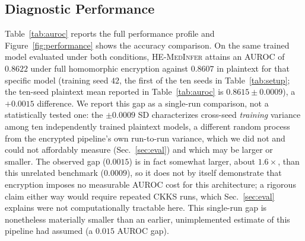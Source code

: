\documentclass[journal,compsoc]{IEEEtran}
\newcommand{\framework}{\textsc{HE-MedInfer}}
\begin{document}
\subsection{Diagnostic Performance}

Table~\ref{tab:auroc} reports the full performance profile and
Figure~\ref{fig:performance} shows the accuracy comparison. On the same
trained model evaluated under both conditions, \framework{} attains an AUROC
of $0.8622$ under full homomorphic encryption against $0.8607$ in plaintext
for that specific model (training seed $42$, the first of the ten seeds in
Table~\ref{tab:setup}; the ten-seed plaintext mean reported in
Table~\ref{tab:auroc} is $0.8615 \pm 0.0009$), a $+0.0015$ difference. We
report this gap as a single-run comparison, not a statistically tested one:
the $\pm 0.0009$ SD characterizes cross-seed \emph{training} variance among
ten independently trained plaintext models, a different random process from
the encrypted pipeline's own run-to-run variance, which we did not and could
not affordably measure (Sec.~\ref{sec:eval}) and which may be larger or
smaller. The observed gap ($0.0015$) is in fact somewhat larger, about
$1.6\times$, than this unrelated benchmark ($0.0009$), so it does not by
itself demonstrate that encryption imposes no measurable AUROC cost for
this architecture; a rigorous claim either way would require repeated CKKS
runs, which Sec.~\ref{sec:eval} explains were not
computationally tractable here. This single-run gap is nonetheless
materially smaller than an earlier, unimplemented estimate of this pipeline
had assumed (a $0.015$ AUROC gap).
\end{document}
